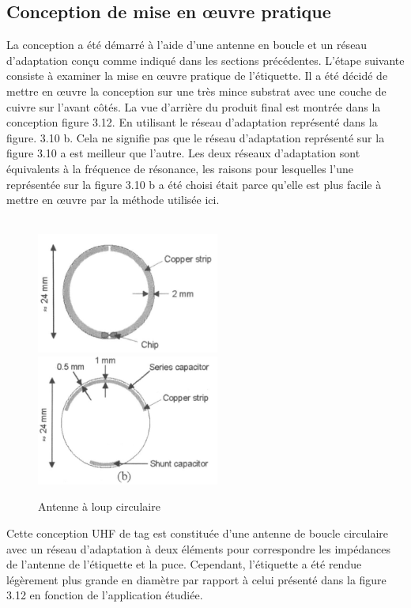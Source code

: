 \documentclass[11pt, a4paper, twoside]{book}
\begin{document}
\subsection{Conception de mise en œuvre pratique}
La conception a été démarré à l'aide d'une antenne en boucle et un réseau d'adaptation conçu comme indiqué dans les sections précédentes. L'étape suivante consiste à examiner la mise en œuvre pratique de l'étiquette. Il a été décidé de mettre en œuvre la conception sur une très mince substrat avec une couche de cuivre sur l'avant côtés. La vue d'arrière du produit final est montrée dans la conception figure 3.12. En utilisant le réseau d'adaptation représenté dans la figure. 3.10 b. Cela ne signifie pas que le réseau d'adaptation représenté sur la figure 3.10 a est meilleur que l'autre. Les deux réseaux d'adaptation sont équivalents à la fréquence de résonance, les raisons pour lesquelles l'une représentée sur la figure 3.10 b a été choisi était parce qu'elle est plus facile à mettre en œuvre par la méthode utilisée ici.\\\\
\begin{figure}[H]
\centering
\includegraphics[width=6cm]{front}
\includegraphics[width=6cm]{back}
\caption{Antenne à loup circulaire}
\end{figure}

Cette conception UHF de tag est constituée d'une antenne de boucle circulaire avec un réseau d'adaptation à deux éléments pour correspondre les impédances de l'antenne de l'étiquette et la puce. Cependant, l'étiquette a été rendue légèrement plus grande en diamètre par rapport à celui présenté dans la figure 3.12 en fonction de l'application étudiée. 
\end{document}
